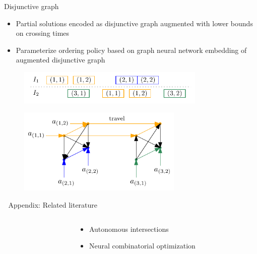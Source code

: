 \documentclass[bigger]{beamer}
\begin{document}
\begin{frame}[label={sec:org4cb65af}]{Disjunctive graph}
\begin{itemize}
\item Partial solutions encoded as disjunctive graph augmented with lower bounds on crossing times
\item Parameterize ordering policy based on graph neural network embedding of augmented disjunctive graph
\end{itemize}

\begin{figure}
  \centering
  \includegraphics[width=0.8\textwidth]{figures/network_bilevel-1.pdf}
\end{figure}

\begin{figure}
  \centering
  \includegraphics[width=0.7\textwidth]{figures/disjunctive_graph_complete.pdf}
\end{figure}
\end{frame}
\begin{frame}[label={sec:org9f2f8d4}]{\(\;\)}
\centering
\color{structure}
\Large Appendix: Related literature
\normalsize
\vspace{2em}

\begin{columns}
\begin{column}{0.17\textwidth}
\end{column}

\begin{column}{0.83\textwidth}
\begin{itemize}

\item Autonomous intersections
\item Neural combinatorial optimization

\end{itemize}
\end{column}
\end{columns}
\end{frame}
\end{document}
